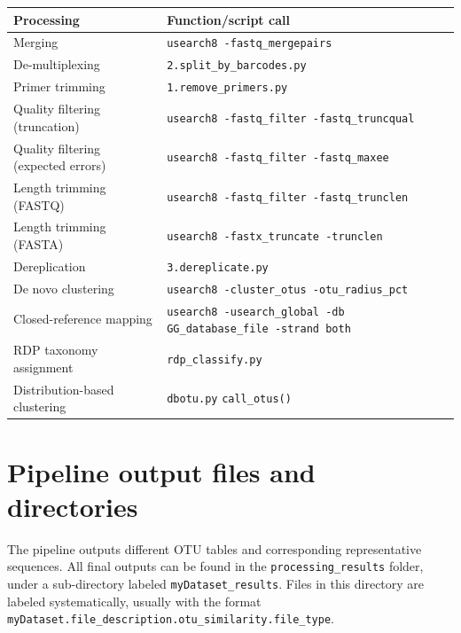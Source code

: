 \documentclass[11pt, oneside]{article}   	%
\begin{document}
{
\renewcommand{\arraystretch}{1.2}
\begin{center}
\begin{longtable}{| p{5.5cm} | p{10cm} |}
    \hline
      \textbf{Processing} & \textbf{Function/script call} \\
      \hline
      Merging & \texttt{usearch8 -fastq\_mergepairs} \\
      \hline
      De-multiplexing & \texttt{2.split\_by\_barcodes.py} \\
      \hline
      Primer trimming & \texttt{1.remove\_primers.py} \\
      \hline
      Quality filtering (truncation) & \texttt{usearch8 -fastq\_filter -fastq\_truncqual} \\
      \hline
      Quality filtering (expected errors) & \texttt{usearch8 -fastq\_filter -fastq\_maxee} \\
      \hline
      Length trimming (FASTQ) & \texttt{usearch8 -fastq\_filter -fastq\_trunclen} \\
      \hline
      Length trimming (FASTA) & \texttt{usearch8 -fastx\_truncate -trunclen} \\
      \hline
      Dereplication & \texttt{3.dereplicate.py} \\      
      \hline
      De novo clustering & \texttt{usearch8 -cluster\_otus -otu\_radius\_pct} \\
      \hline
      Closed-reference mapping & \texttt{usearch8 -usearch\_global -db GG\_database\_file -strand both} \\
      \hline
      RDP taxonomy assignment & \texttt{rdp\_classify.py} \\
      \hline
      Distribution-based clustering & \texttt{dbotu.py} \texttt{call\_otus()} \\
      \hline
\end{longtable}
\end{center}
}
\section{Pipeline output files and directories}
The pipeline outputs different OTU tables and corresponding representative sequences. All final outputs can be found in the {\tt processing\_results} folder, under a sub-directory labeled {\tt myDataset\_results}. Files in this directory are labeled systematically, usually with the format {\tt myDataset.file\_description.otu\_similarity.file\_type}. 
\end{document}
